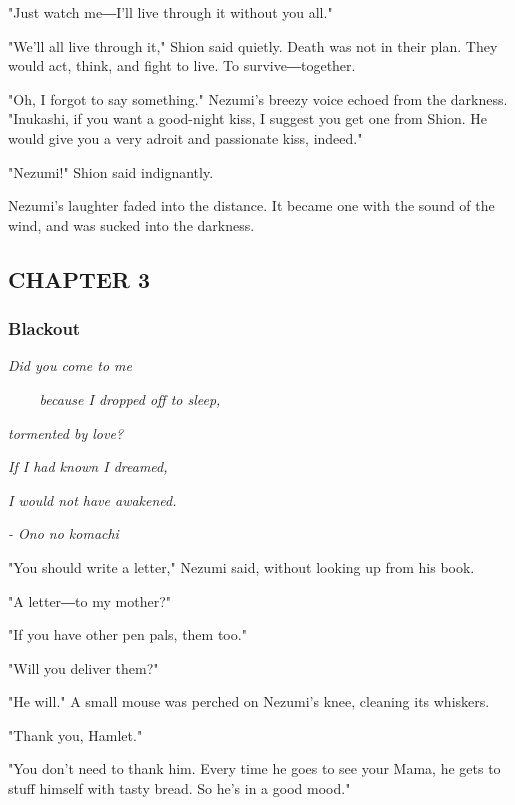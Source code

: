 "Just watch me―I'll live through it without you all."

"We'll all live through it," Shion said quietly. Death was not in their
plan. They would act, think, and fight to live. To survive―together.

"Oh, I forgot to say something." Nezumi's breezy voice echoed from the
darkness. "Inukashi, if you want a good-night kiss, I suggest you get
one from Shion. He would give you a very adroit and passionate kiss,
indeed."

"Nezumi!" Shion said indignantly.

Nezumi's laughter faded into the distance. It became one with the sound
of the wind, and was sucked into the darkness.

\hypertarget{index_split_025.htmlux5cux23calibre_pb_60}{}

\protect\hypertarget{index_split_059.html}{}{}

\hypertarget{index_split_059.htmlux5cux23calibre_pb_0}{}

\hypertarget{index_split_059.htmlux5cux23calibre_toc_4}{%
\subsection{CHAPTER 3}\label{index_split_059.htmlux5cux23calibre_toc_4}}

\subsubsection{Blackout}

\emph{Did you come to me}

\emph{~ ~ ~because I dropped off to sleep,}

\emph{tormented by love?}

\emph{If I had known I dreamed,}

\emph{I would not have awakened.~}

\emph{- Ono no komachi}~

"You should write a letter," Nezumi said, without looking up from his
book.

"A letter―to my mother?"

"If you have other pen pals, them too."

"Will you deliver them?"

"He will." A small mouse was perched on Nezumi's knee, cleaning its
whiskers.

"Thank you, Hamlet."

"You don't need to thank him. Every time he goes to see your Mama, he
gets to stuff himself with tasty bread. So he's in a good mood."

